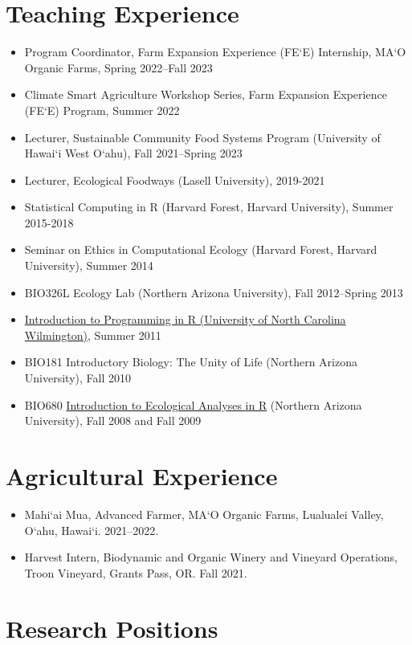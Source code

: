 \documentclass[a4paper]{article}
\begin{document}
\section{Teaching Experience}\label{teaching-experience}
\begin{itemize}
\item Program Coordinator, Farm Expansion Experience (FE‘E)
  Internship, MA‘O Organic Farms, Spring 2022--Fall 2023
\item Climate Smart Agriculture Workshop Series, Farm Expansion Experience (FE‘E) Program, Summer 2022
\item Lecturer, Sustainable Community Food Systems Program (University
  of Hawai‘i West O‘ahu), Fall 2021--Spring 2023
\item Lecturer, Ecological Foodways (Lasell University), 2019-2021
\item
  Statistical Computing in R (Harvard Forest, Harvard
  University), Summer 2015-2018
\item
  Seminar on Ethics in Computational Ecology (Harvard Forest, Harvard
  University), Summer 2014
\item
  BIO326L Ecology Lab (Northern Arizona University), Fall 2012--Spring
  2013
\item
  \href{http://people.uncw.edu/borretts/courses/RworkshopUNCW.pdf}{Introduction
  to Programming in R (University of North Carolina Wilmington)}, Summer
  2011
\item
  BIO181 Introductory Biology: The Unity of Life (Northern Arizona
  University), Fall 2010
\item
  BIO680
  \href{http://www.mpcer.nau.edu/igert/eco_analysis_r.html}{Introduction
  to Ecological Analyses in R} (Northern Arizona University), Fall 2008
  and Fall 2009
\end{itemize}

\section{Agricultural Experience}

\begin{itemize}
\item Mahi‘ai Mua, Advanced Farmer, MA‘O Organic Farms, Lualualei Valley, O‘ahu,
  Hawai‘i. 2021--2022.
\item Harvest Intern, Biodynamic and Organic Winery and Vineyard Operations, Troon Vineyard,
  Grants Pass, OR. Fall 2021.
\end{itemize}

\section{Research Positions}\label{research-experience}
\end{document}
